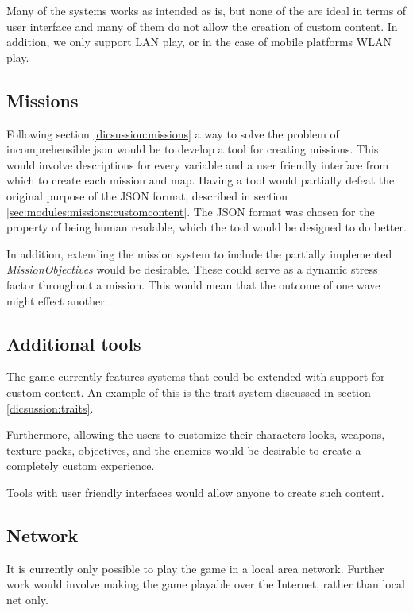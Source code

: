 Many of the systems works as intended as is, but none of the are ideal in terms of user interface and many of them do not allow the creation of custom content.
In addition, we only support LAN play, or in the case of mobile platforms WLAN play.

\subsection{Missions}
Following section \ref{dicsussion:missions} a way to solve the problem of incomprehensible json would be to develop a tool for creating missions.
This would involve descriptions for every variable and a user friendly interface from which to create each mission and map.
Having a tool would partially defeat the original purpose of the JSON format, described in section \ref{sec:modules:missions:customcontent}.
The JSON format was chosen for the property of being human readable, which the tool would be designed to do better.

In addition, extending the mission system to include the partially implemented \textit{MissionObjectives} would be desirable.
These could serve as a dynamic stress factor throughout a mission.
This would mean that the outcome of one wave might effect another.

\subsection{Additional tools}
The game currently features systems that could be extended with support for custom content.
An example of this is the trait system discussed in section \ref{dicsussion:traits}.

Furthermore, allowing the users to customize their characters looks, weapons, texture packs, objectives, and the enemies would be desirable to create a completely custom experience.

Tools with user friendly interfaces would allow anyone to create such content.

\subsection{Network}

It is currently only possible to play the game in a local area network.
Further work would involve making the game playable over the Internet, rather than local net only.

